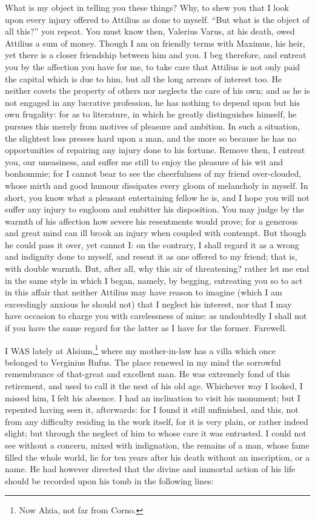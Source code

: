What is my object in telling you these things? Why, to shew you that I
look upon every injury offered to Attilius as done to myself. ``But what is
the object of all this?'' you repeat. You must know then, Valerius Varus,
at his death, owed Attilius a sum of money. Though I am on friendly terms
with Maximus, his heir, yet there is a closer friendship between him and
you. I beg therefore, and entreat you by the affection you have for me, to
take care that Attilius is not only paid the capital which is due to him,
but all the long arrears of interest too. He neither covets the property
of others nor neglects the care of his own; and as he is not engaged in
any lucrative profession, he has nothing to depend upon but his own
frugality: for as to literature, in which he greatly distinguishes
himself, he pursues this merely from motives of pleasure and ambition. In
such a situation, the slightest loss presses hard upon a man, and the more
so because he has no opportunities of repairing any injury done to his
fortune. Remove then, I entreat you, our uneasiness, and suffer me still
to enjoy the pleasure of his wit and bonhommie; for I cannot bear to see
the cheerfulness of my friend over-clouded, whose mirth and good humour
dissipates every gloom of melancholy in myself. In short, you know what a
pleasant entertaining fellow he is, and I hope you will not suffer any
injury to engloom and embitter his disposition. You may judge by the
warmth of his affection how severe his resentments would prove; for a
generous and great mind can ill brook an injury when coupled with
contempt. But though he could pass it over, yet cannot I: on the contrary,
I shall regard it as a wrong and indignity done to myself, and resent it
as one offered to my friend; that is, with double warmth. But, after all,
why this air of threatening? rather let me end in the same style in which
I began, namely, by begging, entreating you so to act in this affair that
neither Attilius may have reason to imagine (which I am exceedingly
anxious he should not) that I neglect his interest, nor that I may have
occasion to charge you with carelessness of mine: as undoubtedly I shall
not if you have the same regard for the latter as I have for the former.
Farewell.


I WAS lately at Alsium,\footnote{Now Alzia, not far from
Corno.} where my mother-in-law has a villa which once
belonged to Verginius Rufus. The place renewed in my mind the sorrowful
remembrance of that-great and excellent man. He was extremely fond of this
retirement, and used to call it the nest of his old age. Whichever way I
looked, I missed him, I felt his absence. I had an inclination to visit
his monument; but I repented having seen it, afterwards: for I found it
still unfinished, and this, not from any difficulty residing in the work
itself, for it is very plain, or rather indeed slight; but through the
neglect of him to whose care it was entrusted. I could not see without a
concern, mixed with indignation, the remains of a man, whose fame filled
the whole world, lie for ten years after his death without an inscription,
or a name. He had however directed that the divine and immortal action of
his life should be recorded upon his tomb in the following lines:

